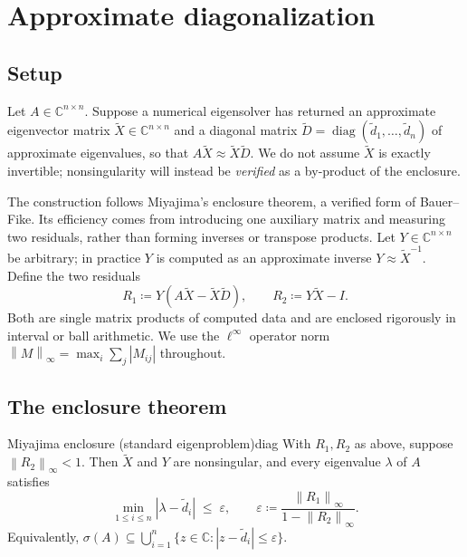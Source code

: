 \documentclass[11pt, a4paper]{article}
\numberwithin{equation}{section}
\newcommand{\norm}[1]{\left\|#1\right\|}
\newcommand{\abs}[1]{\left|#1\right|}
\newcommand{\tX}{\widetilde{X}}
\newcommand{\tD}{\widetilde{D}}
\newcommand{\C}{\mathbb{C}}
\begin{document}
\section{Approximate diagonalization}
\label{sec:diag}

\subsection{Setup}

Let $A \in \C^{n\times n}$.  Suppose a numerical eigensolver has returned an
approximate eigenvector matrix $\tX \in \C^{n\times n}$ and a diagonal matrix
$\tD = \operatorname{diag}(\tilde d_1,\ldots,\tilde d_n)$ of approximate
eigenvalues, so that $A\tX \approx \tX\tD$.  We do not assume $\tX$ is exactly
invertible; nonsingularity will instead be \emph{verified} as a by-product of
the enclosure.

The construction follows Miyajima's enclosure theorem, a verified form of
Bauer--Fike.  Its efficiency comes from introducing one auxiliary matrix and
measuring two residuals, rather than forming inverses or transpose products.
Let $Y \in \C^{n\times n}$ be arbitrary; in practice $Y$ is computed as an
approximate inverse $Y \approx \tX^{-1}$.  Define the two residuals
\[
  R_1 \coloneqq Y(A\tX - \tX\tD), \qquad
  R_2 \coloneqq Y\tX - I.
\]
Both are single matrix products of computed data and are enclosed rigorously in
interval or ball arithmetic.  We use the $\ell^\infty$ operator norm
$\norm{M}_\infty = \max_i \sum_j \abs{M_{ij}}$ throughout.

\subsection{The enclosure theorem}

\begin{theorem}{Miyajima enclosure (standard eigenproblem)}{diag}
  With $R_1, R_2$ as above, suppose $\norm{R_2}_\infty < 1$.  Then $\tX$ and $Y$
  are nonsingular, and every eigenvalue $\lambda$ of $A$ satisfies
  \[
    \min_{1\le i\le n}\abs{\lambda - \tilde d_i} \;\le\; \varepsilon,
    \qquad
    \varepsilon \coloneqq \frac{\norm{R_1}_\infty}{1 - \norm{R_2}_\infty}.
  \]
  Equivalently, $\sigma(A) \subseteq \bigcup_{i=1}^n \{ z \in \C :
  \abs{z - \tilde d_i} \le \varepsilon \}$.
\end{theorem}
\end{document}
